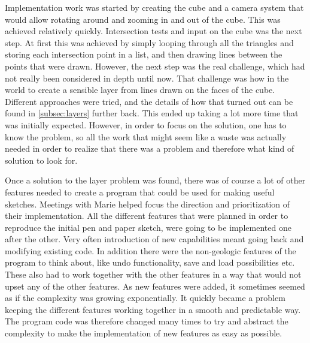 \documentclass[a4paper,12pt]{report}
\newcommand{\secref}[1]{\autoref{#1}}
\begin{document}
Implementation work was started by creating the cube and a camera system that would allow rotating around and zooming in and out of the cube. This was achieved relatively quickly. Intersection tests and input on the cube was the next step. At first this was achieved by simply looping through all the triangles and storing each intersection point in a list, and then drawing lines between the points that were drawn. However, the next step was the real challenge, which had not really been considered in depth until now. That challenge was how in the world to create a sensible layer from lines drawn on the faces of the cube. Different approaches were tried, and the details of how that turned out can be found in \secref{subsec:layers} further back. This ended up taking a lot more time that was initially expected. However, in order to focus on the solution, one has to know the problem, so all the work that might seem like a waste was actually needed in order to realize that there was a problem and therefore what 
kind of solution to look for.

Once a solution to the layer problem was found, there was of course a lot of other features needed to create a program that could be used for making useful sketches. Meetings with Marie helped focus the direction and prioritization of their implementation. All the different features that were planned in order to reproduce the initial pen and paper sketch, were going to be implemented one after the other. Very often introduction of new capabilities meant going back and modifying existing code. In addition there were the non-geologic features of the program to think about, like undo functionality, save and load possibilities etc. These also had to work together with the other features in a way that would not upset any of the other features. As new features were added, it sometimes seemed as if the complexity was growing exponentially. It quickly became a problem keeping the different features working together in a smooth and predictable way. The program code was therefore changed many times to try and abstract 
the complexity to make the implementation of new features as easy as possible.
\end{document}
